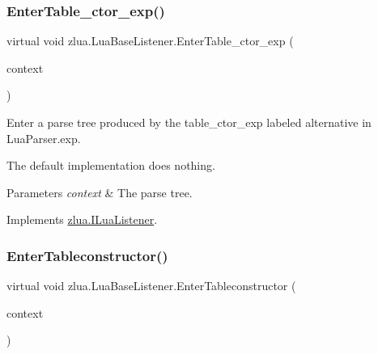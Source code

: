 \subsubsection{\texorpdfstring{Enter\+Table\+\_\+ctor\+\_\+exp()}{EnterTable\_ctor\_exp()}}
{\footnotesize\ttfamily virtual void zlua.\+Lua\+Base\+Listener.\+Enter\+Table\+\_\+ctor\+\_\+exp (\begin{DoxyParamCaption}\item[{\mbox{[}\+Not\+Null\mbox{]} \mbox{\hyperlink{classzlua_1_1_lua_parser_1_1_table__ctor__exp_context}{Lua\+Parser.\+Table\+\_\+ctor\+\_\+exp\+Context}}}]{context }\end{DoxyParamCaption})\hspace{0.3cm}{\ttfamily [virtual]}}



Enter a parse tree produced by the {\ttfamily table\+\_\+ctor\+\_\+exp} labeled alternative in Lua\+Parser.\+exp. 

The default implementation does nothing.


\begin{DoxyParams}{Parameters}
{\em context} & The parse tree.\\
\hline
\end{DoxyParams}


Implements \mbox{\hyperlink{interfacezlua_1_1_i_lua_listener_a8f36bb02f3d3923600ba29606adf1db4}{zlua.\+I\+Lua\+Listener}}.

\mbox{\label{classzlua_1_1_lua_base_listener_a1aff2c410cda086c68c4dd53123c8082}} 
\subsubsection{\texorpdfstring{Enter\+Tableconstructor()}{EnterTableconstructor()}}
{\footnotesize\ttfamily virtual void zlua.\+Lua\+Base\+Listener.\+Enter\+Tableconstructor (\begin{DoxyParamCaption}\item[{\mbox{[}\+Not\+Null\mbox{]} \mbox{\hyperlink{classzlua_1_1_lua_parser_1_1_tableconstructor_context}{Lua\+Parser.\+Tableconstructor\+Context}}}]{context }\end{DoxyParamCaption})\hspace{0.3cm}{\ttfamily [virtual]}}



